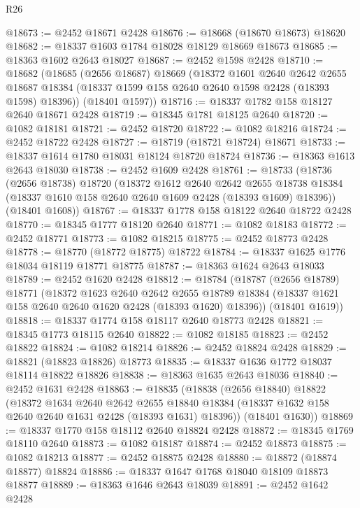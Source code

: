 \begin{lexlean}{R26}
\begin{coremodule}
@18673 := @2452 @18671 @2428
@18676 := @18668 (@18670 @18673) @18620
@18682 := @18337 @1603 @1784 @18028 @18129 @18669 @18673
@18685 := @18363 @1602 @2643 @18027
@18687 := @2452 @1598 @2428
@18710 := @18682
    (@18685
      (@2656 @18687)
      @18669
      (@18372
        @1601
        @2640
        @2642
        @2655
        @18687
        @18384
        (@18337 @1599 @158 @2640 @2640 @1598 @2428 (@18393 @1598) @18396))
      (@18401 @1597))
@18716 := @18337 @1782 @158 @18127 @2640 @18671 @2428
@18719 := @18345 @1781 @18125 @2640
@18720 := @1082 @18181
@18721 := @2452 @18720
@18722 := @1082 @18216
@18724 := @2452 @18722 @2428
@18727 := @18719 (@18721 @18724) @18671
@18733 := @18337 @1614 @1780 @18031 @18124 @18720 @18724
@18736 := @18363 @1613 @2643 @18030
@18738 := @2452 @1609 @2428
@18761 := @18733
    (@18736
      (@2656 @18738)
      @18720
      (@18372
        @1612
        @2640
        @2642
        @2655
        @18738
        @18384
        (@18337 @1610 @158 @2640 @2640 @1609 @2428 (@18393 @1609) @18396))
      (@18401 @1608))
@18767 := @18337 @1778 @158 @18122 @2640 @18722 @2428
@18770 := @18345 @1777 @18120 @2640
@18771 := @1082 @18183
@18772 := @2452 @18771
@18773 := @1082 @18215
@18775 := @2452 @18773 @2428
@18778 := @18770 (@18772 @18775) @18722
@18784 := @18337 @1625 @1776 @18034 @18119 @18771 @18775
@18787 := @18363 @1624 @2643 @18033
@18789 := @2452 @1620 @2428
@18812 := @18784
    (@18787
      (@2656 @18789)
      @18771
      (@18372
        @1623
        @2640
        @2642
        @2655
        @18789
        @18384
        (@18337 @1621 @158 @2640 @2640 @1620 @2428 (@18393 @1620) @18396))
      (@18401 @1619))
@18818 := @18337 @1774 @158 @18117 @2640 @18773 @2428
@18821 := @18345 @1773 @18115 @2640
@18822 := @1082 @18185
@18823 := @2452 @18822
@18824 := @1082 @18214
@18826 := @2452 @18824 @2428
@18829 := @18821 (@18823 @18826) @18773
@18835 := @18337 @1636 @1772 @18037 @18114 @18822 @18826
@18838 := @18363 @1635 @2643 @18036
@18840 := @2452 @1631 @2428
@18863 := @18835
    (@18838
      (@2656 @18840)
      @18822
      (@18372
        @1634
        @2640
        @2642
        @2655
        @18840
        @18384
        (@18337 @1632 @158 @2640 @2640 @1631 @2428 (@18393 @1631) @18396))
      (@18401 @1630))
@18869 := @18337 @1770 @158 @18112 @2640 @18824 @2428
@18872 := @18345 @1769 @18110 @2640
@18873 := @1082 @18187
@18874 := @2452 @18873
@18875 := @1082 @18213
@18877 := @2452 @18875 @2428
@18880 := @18872 (@18874 @18877) @18824
@18886 := @18337 @1647 @1768 @18040 @18109 @18873 @18877
@18889 := @18363 @1646 @2643 @18039
@18891 := @2452 @1642 @2428

\end{coremodule}
\end{lexlean}
